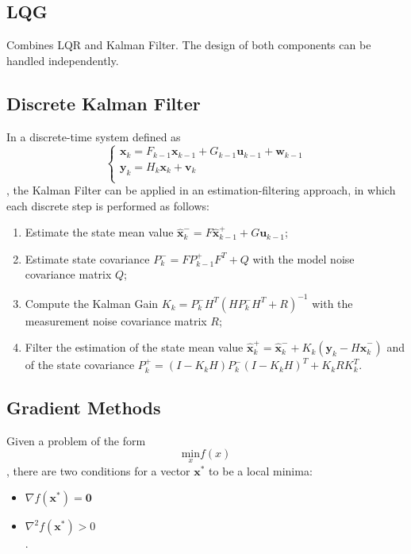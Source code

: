 \documentclass[a4paper]{report}
\begin{document}
\subsection*{LQG}

Combines LQR and Kalman Filter. The design of both components can be handled independently.

\subsection*{Discrete Kalman Filter}

In a discrete-time system defined as \[
    \begin{cases}
        \bm{x}_k = F_{k-1}\bm{x}_{k-1} + G_{k-1}\bm{u}_{k-1} + \bm{w}_{k-1} \\
	\bm{y}_k = H_k\bm{x}_k + \bm{v}_k \\
    \end{cases}
\], the Kalman Filter can be applied in an estimation-filtering approach, in which each discrete step is performed as follows:
\begin{enumerate}
    \item Estimate the state mean value $\bm{\hat{x}}_k^{-} = F\bm{\hat{x}}_{k-1}^{+} + G\bm{u}_{k-1}$;
    \item Estimate state covariance $P_k^{-} = FP_{k-1}^{+}F^{T} + Q$ with the model noise covariance matrix $Q$;
    \item Compute the Kalman Gain $K_k = P_k^{-}H^{T}\left( HP_k^{-}H^{T} + R \right) ^{-1}$ with the measurement noise covariance matrix $R$;
    \item Filter the estimation of the state mean value $\bm{\hat{x}}_k^{+} = \bm{\hat{x}}_k^{-} + K_k\left( \bm{y}_k - H\bm{\hat{x}}_k^{-} \right)$ and of the state covariance $P_k^{+} = \left( I - K_kH \right) P_k^{-}\left( I-K_kH \right) ^{T} + K_kRK_k^{T}$.
\end{enumerate}

\subsection*{Gradient Methods}

Given a problem of the form \[
    \underset{x}{\text{min}} f(x)
\], there are two conditions for a vector $\bm{x}^{*}$ to be a local minima:
\begin{itemize}
    \item $\nabla f(\bm{x}^{*}) = \bm{0}$ \\
    \item $\nabla ^2f(\bm{x}^{*}) > 0$ \\
.\end{itemize}
\end{document}
